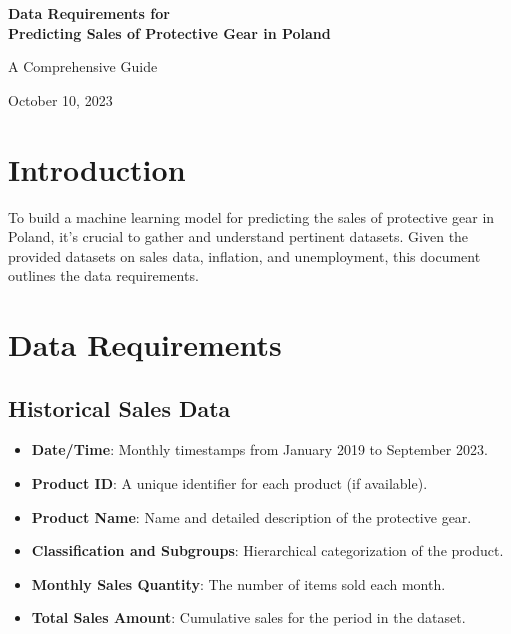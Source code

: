 \documentclass{article}
\begin{document}
\begin{titlepage}
    \centering
    \vspace*{4cm}
    {\Huge\bfseries Data Requirements for \\ Predicting Sales of Protective Gear in Poland \par}
    \vspace{2cm}
    {\large A Comprehensive Guide \par}
    \vfill
    \vspace{2cm}
    {\large October 10, 2023\par}
\end{titlepage}

\newpage
\tableofcontents
\newpage    

\section{Introduction}
To build a machine learning model for predicting the sales of protective gear in Poland, it's crucial to gather and understand pertinent datasets. Given the provided datasets on sales data, inflation, and unemployment, this document outlines the data requirements.

\section{Data Requirements}

\subsection{Historical Sales Data}

\begin{itemize}
    \item \textbf{Date/Time}: Monthly timestamps from January 2019 to September 2023.
    \item \textbf{Product ID}: A unique identifier for each product (if available).
    \item \textbf{Product Name}: Name and detailed description of the protective gear.
    \item \textbf{Classification and Subgroups}: Hierarchical categorization of the product.
    \item \textbf{Monthly Sales Quantity}: The number of items sold each month.
    \item \textbf{Total Sales Amount}: Cumulative sales for the period in the dataset.
\end{itemize}
\end{document}
